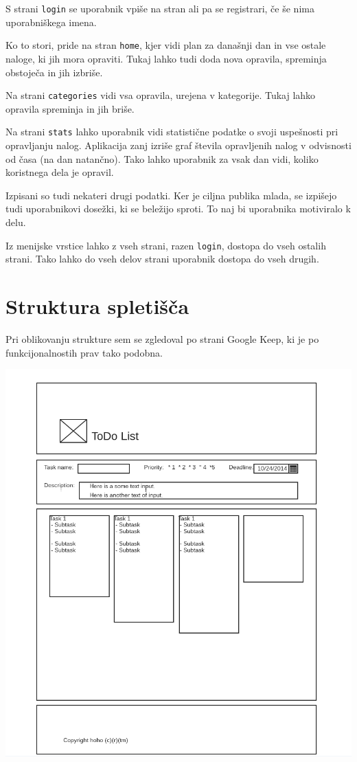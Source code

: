 \documentclass[12pt]{article}
\begin{document}
S strani \texttt{login} se uporabnik vpiše na stran ali pa se registrari, če še nima uporabniškega imena. 

Ko to stori, pride na stran \texttt{home}, kjer vidi plan za današnji dan in vse ostale naloge, ki jih mora opraviti. Tukaj lahko tudi doda nova opravila, spreminja obstoječa in jih izbriše.

Na strani \texttt{categories} vidi vsa opravila, urejena v kategorije. Tukaj lahko opravila spreminja in jih briše.

Na strani \texttt{stats} lahko uporabnik vidi statistične podatke o svoji uspešnosti pri opravljanju nalog. Aplikacija zanj izriše graf števila opravljenih nalog v odvisnosti od časa (na dan natančno). Tako lahko uporabnik za vsak dan vidi, koliko koristnega dela je opravil.

Izpisani so tudi nekateri drugi podatki. Ker je ciljna publika mlada, se izpišejo tudi uporabnikovi dosežki, ki se beležijo sproti. To naj bi uporabnika motiviralo k delu.

Iz menijske vrstice lahko z vseh strani, razen \texttt{login}, dostopa do vseh ostalih strani. Tako lahko do vseh delov strani uporabnik dostopa do vseh drugih.

\newpage
\section{Struktura spletišča}
Pri oblikovanju strukture sem se zgledoval po strani Google Keep, ki je po funkcijonalnostih prav tako podobna. 

\includegraphics[scale=0.4]{wireframe_main.png}
\end{document}

